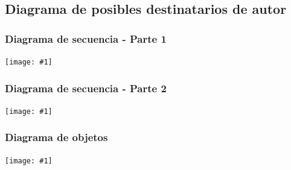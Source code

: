 \documentclass[a4paper, 10pt, twoside]{article}
\newcommand{\grafico}[1]{
  \begin{center}
    \texttt{[image: \#1]}
  \end{center}
}
\begin{document}
\subsection{Diagrama de posibles destinatarios de autor}

\subsubsection{Diagrama de secuencia - Parte 1}
\label{sec-destinatarios1}
\grafico{diagramas/secuenciaPosiblesDestinatarios1.pdf}

\subsubsection{Diagrama de secuencia - Parte 2}
\label{sec-destinatarios2}
\grafico{diagramas/secuenciaPosiblesDestinatarios2.pdf}

\subsubsection{Diagrama de objetos}
\label{obj-destinatarios}
\grafico{diagramas/objetosPosiblesDestinatarios.pdf}
\end{document}

